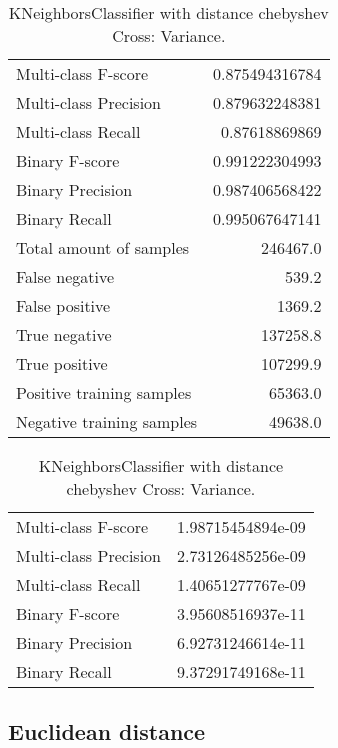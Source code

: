 \begin{table}[H]
\begin{minipage}{0.5\textwidth}
\caption{KNeighborsClassifier with distance chebyshev Cross: Average.}
\centering
\begin{tabular}{l r}
\toprule
Multi-class F-score & 0.875494316784 \\
Multi-class Precision & 0.879632248381 \\
Multi-class Recall & 0.87618869869 \\
\midrule
Binary F-score & 0.991222304993 \\
Binary Precision & 0.987406568422 \\
Binary Recall & 0.995067647141 \\
\midrule
Total amount of samples & 246467.0 \\
False negative & 539.2 \\
False positive & 1369.2 \\
True negative & 137258.8 \\
True positive & 107299.9 \\
\midrule
Positive training samples & 65363.0 \\
Negative training samples & 49638.0 \\
\bottomrule
\end{tabular}
\end{minipage}
\hfillx
\begin{minipage}{0.5\textwidth}
\caption{KNeighborsClassifier with distance chebyshev Cross: Variance.}
\centering
\begin{tabular}{l r}
\toprule
Multi-class F-score & 1.98715454894e-09 \\
Multi-class Precision & 2.73126485256e-09 \\
Multi-class Recall & 1.40651277767e-09 \\
\midrule
Binary F-score & 3.95608516937e-11 \\
Binary Precision & 6.92731246614e-11 \\
Binary Recall & 9.37291749168e-11 \\
\bottomrule
\end{tabular}
\end{minipage}
\end{table}

\newpage
\subsection{Euclidean distance}


